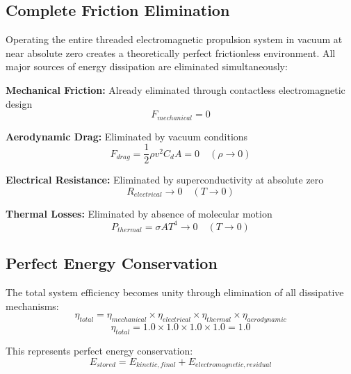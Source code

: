 \documentclass[12pt,a4paper]{article}
\begin{document}
\subsection{Complete Friction Elimination}

Operating the entire threaded electromagnetic propulsion system in vacuum at near absolute zero creates a theoretically perfect frictionless environment. All major sources of energy dissipation are eliminated simultaneously:

\textbf{Mechanical Friction:} Already eliminated through contactless electromagnetic design
\begin{equation}
F_{mechanical} = 0
\end{equation}

\textbf{Aerodynamic Drag:} Eliminated by vacuum conditions
\begin{equation}
F_{drag} = \frac{1}{2}\rho v^2 C_d A = 0 \quad (\rho \rightarrow 0)
\end{equation}

\textbf{Electrical Resistance:} Eliminated by superconductivity at absolute zero
\begin{equation}
R_{electrical} \rightarrow 0 \quad (T \rightarrow 0)
\end{equation}

\textbf{Thermal Losses:} Eliminated by absence of molecular motion
\begin{equation}
P_{thermal} = \sigma A T^4 \rightarrow 0 \quad (T \rightarrow 0)
\end{equation}

\subsection{Perfect Energy Conservation}

The total system efficiency becomes unity through elimination of all dissipative mechanisms:
\begin{equation}
\eta_{total} = \eta_{mechanical} \times \eta_{electrical} \times \eta_{thermal} \times \eta_{aerodynamic}
\end{equation}
\begin{equation}
\eta_{total} = 1.0 \times 1.0 \times 1.0 \times 1.0 = 1.0
\end{equation}

This represents perfect energy conservation:
\begin{equation}
E_{stored} = E_{kinetic,final} + E_{electromagnetic,residual}
\end{equation}
\end{document}
